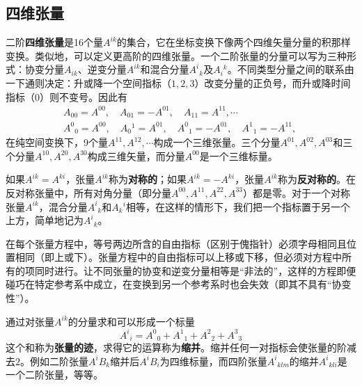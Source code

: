 \subsection{四维张量}

二阶{\bf 四维张量}是16个量$A^{ik}$的集合，它在坐标变换下像两个四维矢量分量的积那样变换。类似地，可以定义更高阶的四维张量。一个二阶张量的分量可以写为三种形式：协变分量$A_{ik}$、逆变分量$A^{ik}$和混合分量$A^i{}_k$及$A_i{}^k$。不同类型分量之间的联系由一下通则决定：升或降一个空间指标（$1,2,3$）改变分量的正负号，而升或降时间指标（$0$）则不变号。因此有
\begin{align*}
	& A_{00} = A^{00},\quad A_{01} = -A^{01},\quad A_{11} = A^{11},\cdots \\
	& A^0{}_0 = A^{00},\quad A_0{}^1 = A^{01},\quad A^0{}_1 = -A^{01},\quad A^1{}_1 = -A^{11},\quad 
\end{align*}
在纯空间变换下，9个量$A^{11},A^{12},\cdots$构成一个三维张量。三个分量$A^{01},A^{02},A^{03}$和三个分量$A^{10},A^{20},A^{30}$构成三维矢量，而分量$A^{00}$是一个三维标量。

如果$A^{ik} = A^{ki}$，张量$A^{ik}$称为{\bf 对称的}；如果$A^{ik} = -A^{ki}$，张量$A^{ik}$称为{\bf 反对称的}。在反对称张量中，所有对角分量（即分量$A^{00},A^{11},A^{22},A^{33}$）都是零。对于一个对称张量$A^{ik}$，混合分量$A^i{}_k$和$A_k{}^i$相等，在这样的情形下，我们把一个指标置于另一个上方，简单地记为$A^i{}_k$。

在每个张量方程中，等号两边所含的自由指标（区别于傀指针）必须字母相同且位置相同（即上或下）。张量方程中的自由指标可以上移或下移，但必须对方程中所有的项同时进行。让不同张量的协变和逆变分量相等是“非法的”，这样的方程即便碰巧在特定参考系中成立，在变换到另一个参考系时也会失效（即其不具有“协变性”）。

通过对张量$A^{ik}$的分量求和可以形成一个标量
\begin{equation*}
	A^i{}_i = A^0{}_0 + A^1{}_1 + A^2{}_2 + A^3{}_3
\end{equation*}
这个和称为{\bf 张量的迹}，求得它的运算称为{\bf 缩并}。缩并任何一对指标会使张量的阶减去$2$。例如二阶张量$A^iB_k$缩并后$A^iB_i$为四维标量，而四阶张量$A^i{}_{klm}$的缩并$A^i{}_{kli}$是一个二阶张量，等等。


